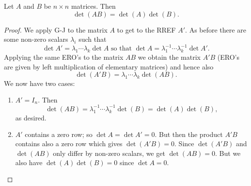 \documentclass[10pt, a4paper]{article}
\begin{document}
\begin{theorem}\label{pre_linalg_thm_detsplits}
    Let $A$ and $B$ be $n \times n$ matrices.
    Then
    \[
    \det(AB) = \det(A)\det(B).
    \]
    \begin{proof}
        We apply G-J to the matrix $A$ to get to the RREF $A'$.
        As before there are some non-zero scalars $\lambda_i$ such that
        \[
        \det A' = \lambda_1\dotsi\lambda_k\det A \text{ so that } \det A = \lambda_1 ^ {-1} \dotsi\lambda_k ^ {-1}\det A'.
        \]
        Applying the same ERO's to the matrix $AB$ we obtain the matrix $A'B$ (ERO's are given by left multiplication of elementary matrices) and hence also
        \[
        \det(A'B) = \lambda_1\dotsi\lambda_k\det(AB).
        \]
        We now have two cases:
        \begin{enumerate}[label = (\roman*)]
            \item 
            $A' = I_n$.
            Then
            \[
            \det(AB) = \lambda_1 ^ {-1} \dotsi \lambda_k ^ {-1}\det(B) = \det(A)\det(B),
            \]
            as desired.
            \item $A'$ contains a zero row;
            so $\det A = \det A' = 0$.
            But then the product $A'B$ contains also a zero row which gives $\det(A'B) = 0$.
            Since $\det(A'B)$ and $\det(AB)$ only differ by non-zero scalars,
            we get $\det(AB) = 0$.
            But we also have $\det(A)\det(B) = 0$ since $\det A = 0$.
        \end{enumerate}
    \end{proof}
\end{theorem}
\end{document}
